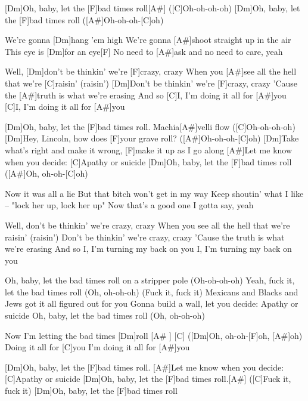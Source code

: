 

\begin{guitar}
	[Dm]Oh, baby, let the [F]bad times roll[A#] ([C]Oh-oh-oh-oh)
	[Dm]Oh, baby, let the [F]bad times roll ([A#]Oh-oh-oh-[C]oh)
	
	We're gonna [Dm]hang 'em high
	We’re gonna [A#]shoot straight up in the air
	This eye is [Dm]for an eye[F]{}
	No need to [A#]ask and no need to care, yeah
	
	Well, [Dm]don't be thinkin' we're [F]crazy, crazy
	When you [A#]see all the hell that we're [C]raisin' (raisin')
	[Dm]Don't be thinkin' we're [F]crazy, crazy
	'Cause the [A#]truth is what we're erasing
	And so [C]I, I’m doing it all for [A#]you
	[C]I, I'm doing it all for [A#]you
	
	[Dm]Oh, baby, let the [F]bad times roll. Machia[A#]velli flow ([C]Oh-oh-oh-oh)
	[Dm]Hey, Lincoln, how does [F]your grave roll? ([A#]Oh-oh-oh-[C]oh)
	[Dm]Take what’s right and make it wrong, [F]make it up as I go along
	[A#]Let me know when you decide: [C]Apathy or suicide
	[Dm]Oh, baby, let the [F]bad times roll ([A#]Oh, oh-oh-[C]oh)
	
	Now it was all a lie
	But that bitch won’t get in my way
	Keep shoutin’ what I like – "lock her up, lock her up"
	Now that’s a good one I gotta say, yeah
	
	\pagebreak
	
	Well, don't be thinkin' we're crazy, crazy
	When you see all the hell that we're raisin' (raisin')
	Don't be thinkin' we're crazy, crazy
	'Cause the truth is what we're erasing
	And so I, I’m turning my back on you
	I, I’m turning my back on you
	
	Oh, baby, let the bad times roll on a stripper pole (Oh-oh-oh-oh)
	Yeah, fuck it, let the bad times roll (Oh, oh-oh-oh) (Fuck it, fuck it)
	Mexicans and Blacks and Jews got it all figured out for you
	Gonna build a wall, let you decide: Apathy or suicide
	Oh, baby, let the bad times roll (Oh, oh-oh-oh)
	
	Now I'm letting the bad times [Dm]roll [A# ] [C]{}
	([Dm]Oh, oh-oh-[F]oh, [A#]oh)
	Doing it all for [C]you
	I'm doing it all for [A#]you
	
	 
	
	[Dm]Oh, baby, let the [F]bad times roll.
	[A#]Let me know when you decide: [C]Apathy or suicide
	[Dm]Oh, baby, let the [F]bad times roll.[A#] ([C]Fuck it, fuck it)
	[Dm]Oh, baby, let the [F]bad times roll
\end{guitar}